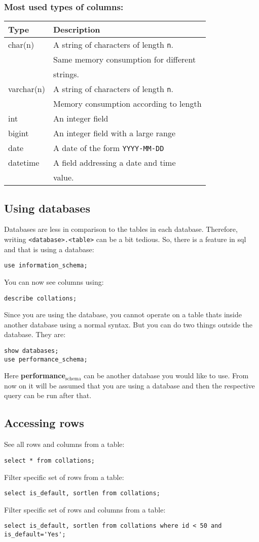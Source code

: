 \documentclass[11pt]{article}
\begin{document}
\subsubsection{Most used types of columns:}
\label{sec:orgheadline7}
\begin{center}
\begin{tabular}{ll}
Type & Description\\
\hline
char(n) & A string of characters of length \texttt{n}.\\
 & Same memory consumption for different\\
 & strings.\\
varchar(n) & A string of characters of length \texttt{n}.\\
 & Memory consumption according to length\\
int & An integer field\\
bigint & An integer field with a large range\\
date & A date of the form \texttt{YYYY-MM-DD}\\
datetime & A field addressing a date and time\\
 & value.\\
\end{tabular}
\end{center}
\subsection{Using databases}
\label{sec:orgheadline5}
Databases are less in comparison to the tables in
each database. Therefore, writing \texttt{<database>.<table>}
can be a bit tedious. So, there is a feature in sql
and that is using a database:
\begin{verbatim}
use information_schema;
\end{verbatim}
You can now see columns using:
\begin{verbatim}
describe collations;
\end{verbatim}
Since you are using the database, you cannot operate
on a table thats inside another database using a normal
syntax.
But you can do two things outside the database. 
They are:
\begin{verbatim}
show databases;
use performance_schema;
\end{verbatim}
Here \textbf{performance\(_{\text{schema}}\)} can be another database you
would like to use.
From now on it will be assumed that you are using a
database and then the respective query can be run after
that.
\subsection{Accessing rows}
\label{sec:orgheadline9}
See all rows and columns from a table:
\begin{verbatim}
select * from collations;
\end{verbatim}
Filter specific set of rows from a table:
\begin{verbatim}
select is_default, sortlen from collations;
\end{verbatim}
Filter specific set of rows and columns from a table:
\begin{verbatim}
select is_default, sortlen from collations where id < 50 and is_default='Yes';
\end{verbatim}
\end{document}
